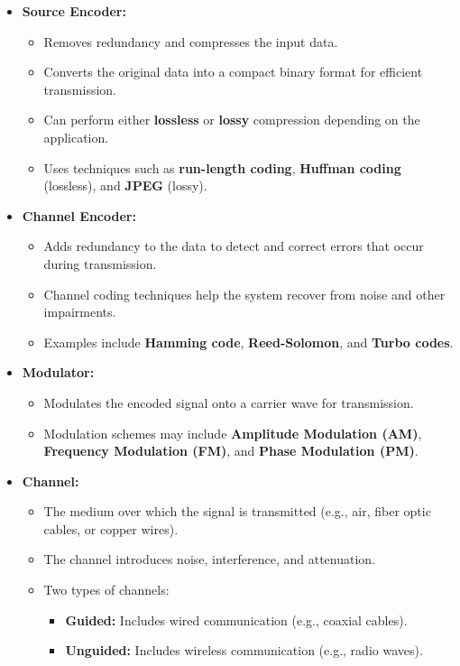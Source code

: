 \documentclass[11pt,a4paper]{book}
\begin{document}
\begin{itemize}
    \item \textbf{Source Encoder:}
          \begin{itemize}
              \item Removes redundancy and compresses the input data.
              \item Converts the original data into a compact binary format for efficient transmission.
              \item Can perform either \textbf{lossless} or \textbf{lossy} compression depending on the application.
              \item Uses techniques such as \textbf{run-length coding}, \textbf{Huffman coding} (lossless), and \textbf{JPEG} (lossy).
          \end{itemize}

    \item \textbf{Channel Encoder:}
          \begin{itemize}
              \item Adds redundancy to the data to detect and correct errors that occur during transmission.
              \item Channel coding techniques help the system recover from noise and other impairments.
              \item Examples include \textbf{Hamming code}, \textbf{Reed-Solomon}, and \textbf{Turbo codes}.
          \end{itemize}

    \item \textbf{Modulator:}
          \begin{itemize}
              \item Modulates the encoded signal onto a carrier wave for transmission.
              \item Modulation schemes may include \textbf{Amplitude Modulation (AM)}, \textbf{Frequency Modulation (FM)}, and \textbf{Phase Modulation (PM)}.
          \end{itemize}

    \item \textbf{Channel:}
          \begin{itemize}
              \item The medium over which the signal is transmitted (e.g., air, fiber optic cables, or copper wires).
              \item The channel introduces noise, interference, and attenuation.
              \item Two types of channels:
                    \begin{itemize}
                        \item \textbf{Guided:} Includes wired communication (e.g., coaxial cables).
                        \item \textbf{Unguided:} Includes wireless communication (e.g., radio waves).
                    \end{itemize}
          \end{itemize}


\end{itemize}
\end{document}
